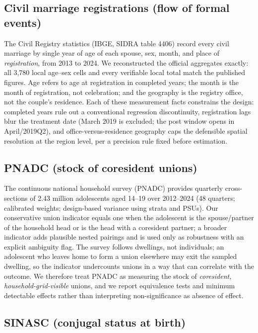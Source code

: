 \documentclass[12pt]{article}
\begin{document}
\subsection{Civil marriage registrations (flow of formal events)}

The Civil Registry statistics (IBGE, SIDRA table 4406) record every civil marriage by
single year of age of each spouse, sex, month, and place of \emph{registration}, from
2013 to 2024. We reconstructed the official aggregates exactly: all 3,780 local age--sex
cells and every verifiable local total match the published figures. Age refers to age at
registration in completed years; the month is the month of registration, not celebration;
and the geography is the registry office, not the couple's residence. Each of these
measurement facts constrains the design: completed years rule out a conventional
regression discontinuity, registration lags blur the treatment date (March 2019 is
excluded; the post window opens in April/2019Q2), and office-versus-residence geography
caps the defensible spatial resolution at the region level, per a precision rule fixed
before estimation.

\subsection{PNADC (stock of coresident unions)}

The continuous national household survey (PNADC) provides quarterly cross-sections of
2.43 million adolescents aged 14--19 over 2012--2024 (48 quarters; calibrated weights;
design-based variance using strata and PSUs). Our conservative union indicator equals one
when the adolescent is the spouse/partner of the household head or is the head with a
coresident partner; a broader indicator adds plausible nested pairings and is used only
as robustness with an explicit ambiguity flag. The survey follows dwellings, not
individuals; an adolescent who leaves home to form a union elsewhere may exit the
sampled dwelling, so the indicator undercounts unions in a way that can correlate with
the outcome. We therefore treat PNADC as measuring the stock of \emph{coresident,
household-grid-visible} unions, and we report equivalence tests and minimum detectable
effects rather than interpreting non-significance as absence of effect.

\subsection{SINASC (conjugal status at birth)}
\end{document}
